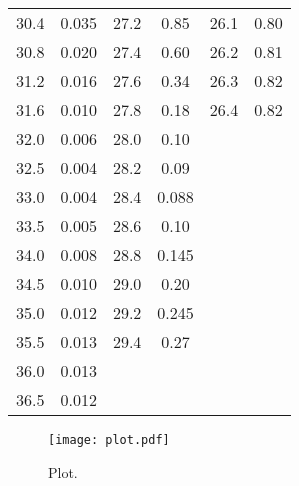 \begin{longtable}{S[table-format=3.2] S[table-format=3.2] S[table-format=3.2] S[table-format=3.2] S[table-format=3.2] S[table-format=3.2]}
          30.4   &   0.035  &     27.2    &  0.85   & 26.1   &   0.80                                      \\
          30.8   &   0.020  &     27.4    &  0.60   & 26.2   &   0.81                                      \\
          31.2   &   0.016  &     27.6    &  0.34   & 26.3   &   0.82                                      \\
          31.6   &   0.010  &     27.8    &  0.18   & 26.4   &   0.82                                      \\
          32.0   &   0.006  &     28.0    &  0.10                                                          \\
          32.5   &   0.004  &     28.2    &  0.09                                                          \\
          33.0   &   0.004  &     28.4    & 0.088                                                          \\
          33.5   &   0.005  &     28.6    &  0.10                                     \\
          34.0   &   0.008  &     28.8    & 0.145                                     \\
          34.5   &   0.010  &     29.0    &  0.20                                     \\
          35.0   &   0.012  &     29.2    & 0.245                                     \\
          35.5   &   0.013  &     29.4    &  0.27                                     \\
          36.0   &   0.013  &                                     \\
          36.5   &   0.012  &                                     \\
                \bottomrule
\end{longtable}


\begin{figure}
  \centering
  \texttt{[image: plot.pdf]}
  \caption{Plot.}
  \label{fig:plot}
\end{figure}
